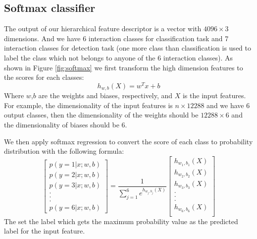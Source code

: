 \subsection{Softmax classifier}
The output of our hierarchical feature descriptor is a vector with \(4096 \times 3\) dimensions. And we have 6 interaction classes for classification task and 7 interaction classes for detection task (one more class than classification is used to label the class which not belongs to anyone of the 6 interaction classes). As shown in Figure \ref{fig:softmax} we first transform the high dimension features to the scores for each classes: 
\begin{equation}
	h_{w,b}(X) = w^Tx + b
\end{equation}
Where \(w\),\(b\) are the weights and biases, respectively, and \(X\) is the input features. For example, the dimensionality of the input features is \(n \times 12288\) and we have 6 output classes, then the dimensionality of the weights should be \(12288 \times 6\) and the dimensionality of biases should be \(6\). 
\par 
We then apply softmax regression to convert the score of each class to probability distribution with the following formula:
\begin{equation}
	\left[
	\begin{matrix}
		p(y=1|x;w,b) \\
		p(y=2|x;w,b) \\
		p(y=3|x;w,b) \\
		. \\
		. \\
		. \\
		p(y=6|x;w,b)
	\end{matrix}
	\right] = \frac{1}{\sum_{j=1}^6 e^{h_{w_j,b_j}(X)}} \left[
	\begin{matrix}
		h_{w_1,b_1}(X) \\
		h_{w_2,b_2}(X) \\
		h_{w_3,b_3}(X) \\
		.\\
		.\\
		.\\
		h_{w_6,b_6}(X) \\		
	\end{matrix}
	\right]
\end{equation} 
The set the label which gets the maximum probability value as the predicted label for the input feature. 
